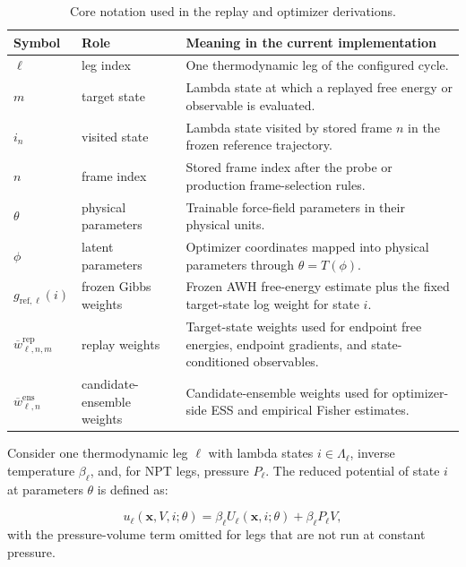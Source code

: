 \begin{table}[t]
    \centering
    \small
    \caption{Core notation used in the replay and optimizer derivations.}
    \label{tab:notation}
    \begin{tabular}{|>{\raggedright\arraybackslash}p{2.1cm}|>{\raggedright\arraybackslash}p{2.6cm}|>{\raggedright\arraybackslash}p{8.3cm}|}
        \hline
        Symbol & Role & Meaning in the current implementation \\
        \hline
        $\ell$ & leg index & One thermodynamic leg of the configured cycle. \\
        \hline
        $m$ & target state & Lambda state at which a replayed free energy or observable is evaluated. \\
        \hline
        $i_n$ & visited state & Lambda state visited by stored frame $n$ in the frozen reference trajectory. \\
        \hline
        $n$ & frame index & Stored frame index after the probe or production frame-selection rules. \\
        \hline
        $\theta$ & physical parameters & Trainable force-field parameters in their physical units. \\
        \hline
        $\phi$ & latent parameters & Optimizer coordinates mapped into physical parameters through $\theta = T(\phi)$. \\
        \hline
        $g_{\mathrm{ref},\ell}(i)$ & frozen Gibbs weights & Frozen AWH free-energy estimate plus the fixed target-state log weight for state $i$. \\
        \hline
        $\overline{w}^{\mathrm{rep}}_{\ell,n,m}$ & replay weights & Target-state weights used for endpoint free energies, endpoint gradients, and state-conditioned observables. \\
        \hline
        $\overline{w}^{\mathrm{ens}}_{\ell,n}$ & candidate-ensemble weights & Candidate-ensemble weights used for optimizer-side ESS and empirical Fisher estimates. \\
        \hline
    \end{tabular}
\end{table}

Consider one thermodynamic leg $\ell$ with lambda states $i \in \Lambda_\ell$, inverse temperature $\beta_\ell$, and, for NPT legs, pressure $P_\ell$. The reduced potential of state $i$ at parameters $\theta$ is defined as:

\begin{equation}
    u_\ell(\mathbf{x}, V, i; \theta)
    =
    \beta_\ell U_\ell(\mathbf{x}, i; \theta)
    +
    \beta_\ell P_\ell V,
    \label{eq:reducedpotential}
\end{equation}
%
with the pressure-volume term omitted for legs that are not run at constant pressure.

